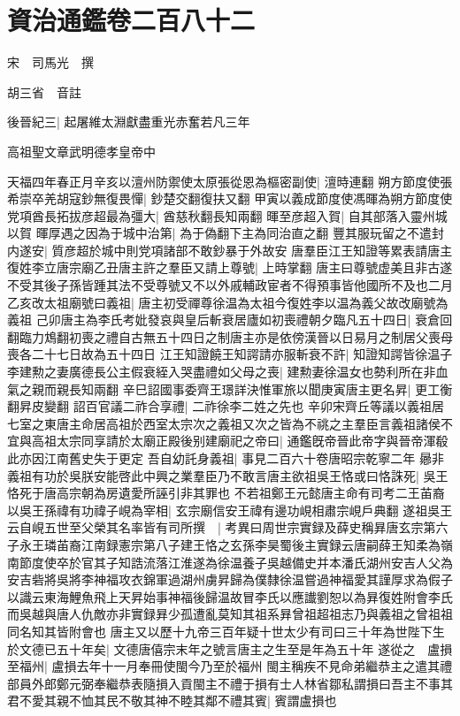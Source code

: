 \chapter{資治通鑑卷二百八十二}
宋　司馬光　撰

胡三省　音註

後晉紀三|{
	起屠維太淵獻盡重光赤奮若凡三年}


高祖聖文章武明德孝皇帝中

天福四年春正月辛亥以澶州防禦使太原張從恩為樞密副使|{
	澶時連翻}
朔方節度使張希崇卒羌胡寇鈔無復畏憚|{
	鈔楚交翻復扶又翻}
甲寅以義成節度使馮暉為朔方節度使党項酋長拓拔彦超最為彊大|{
	酋慈秋翻長知兩翻}
暉至彦超入賀|{
	自其部落入靈州城以賀}
暉厚遇之因為于城中治第|{
	為于偽翻下主為同治直之翻}
豐其服玩留之不遣封内遂安|{
	質彦超於城中則党項諸部不敢鈔暴于外故安}
唐羣臣江王知證等累表請唐主復姓李立唐宗廟乙丑唐主許之羣臣又請上尊號|{
	上時掌翻}
唐主曰尊號虚美且非古遂不受其後子孫皆踵其法不受尊號又不以外戚輔政宦者不得預事皆他國所不及也二月乙亥改太祖廟號曰義祖|{
	唐主初受禪尊徐温為太祖今復姓李以温為義父故改廟號為義祖}
己卯唐主為李氏考妣發哀與皇后斬衰居廬如初喪禮朝夕臨凡五十四日|{
	衰倉回翻臨力鴆翻初喪之禮自古無五十四日之制唐主亦是依傍漢晉以日易月之制居父喪母喪各二十七日故為五十四日}
江王知證饒王知諤請亦服斬衰不許|{
	知證知諤皆徐温子}
李建勲之妻廣德長公主假衰絰入哭盡禮如父母之喪|{
	建勲妻徐温女也勢利所在非血氣之親而親長知兩翻}
辛巳詔國事委齊王璟詳決惟軍旅以聞庚寅唐主更名昇|{
	更工衡翻昇皮變翻}
詔百官議二祚合享禮|{
	二祚徐李二姓之先也}
辛卯宋齊丘等議以義祖居七室之東唐主命居高祖於西室太宗次之義祖又次之皆為不祧之主羣臣言義祖諸侯不宜與高祖太宗同享請於太廟正殿後别建廟祀之帝曰|{
	通鑑旣帝晉此帝字與晉帝渾殽此亦因江南舊史失于更定}
吾自幼託身義祖|{
	事見二百六十卷唐昭宗乾寧二年}
曏非義祖有功於吳朕安能啓此中興之業羣臣乃不敢言唐主欲祖吳王恪或曰恪誅死|{
	吳王恪死于唐高宗朝為房遺愛所誣引非其罪也}
不若祖鄭王元懿唐主命有司考二王苖裔以吳王孫禕有功禕子峴為宰相|{
	玄宗廟信安王禕有邊功峴相肅宗峴戶典翻}
遂祖吳王云自峴五世至父榮其名率皆有司所撰　|{
	考異曰周世宗實録及薛史稱昪唐玄宗第六子永王璘苖裔江南録憲宗第八子建王恪之玄孫李昊蜀後主實録云唐嗣薛王知柔為嶺南節度使卒於官其子知誥流落江淮遂為徐温養子吳越備史并本潘氏湖州安吉人父為安吉砦將吳將李神福攻衣錦軍過湖州虜昇歸為僕隸徐温嘗過神福愛其謹厚求為假子以識云東海鯉魚飛上天昇始事神福後歸温故冒李氏以應䜟劉恕以為昪復姓附會李氏而吳越與唐人仇敵亦非實録昪少孤遭亂莫知其祖系昪曾祖超祖志乃與義祖之曾祖祖同名知其皆附會也}
唐主又以歷十九帝三百年疑十世太少有司曰三十年為世陛下生於文德已五十年矣|{
	文德唐僖宗末年之號言唐主之生至是年為五十年}
遂從之　盧損至福州|{
	盧損去年十一月奉冊使閩今乃至於福州}
閩主稱疾不見命弟繼恭主之遣其禮部員外郎鄭元弼奉繼恭表隨損入貢閩主不禮于損有士人林省鄒私謂損曰吾主不事其君不愛其親不恤其民不敬其神不睦其鄰不禮其賓|{
	賓謂盧損也}
